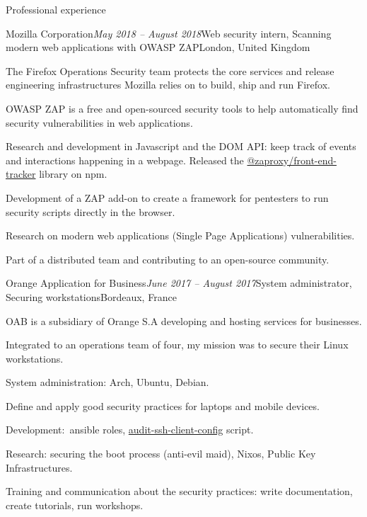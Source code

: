 \begin{rSection}{Professional experience}

  \begin{rSubsection}{Mozilla Corporation}{\em May 2018 -- August 2018}{Web security intern, Scanning modern web applications with OWASP ZAP}{London, United Kingdom}
    \item[]
      The Firefox Operations Security team protects the core services and release engineering infrastructures Mozilla relies on to build, ship and run Firefox.
    \item[]
      OWASP ZAP is a free and open-sourced security tools to help automatically find security vulnerabilities in web applications.

    \item Research and development in Javascript and the DOM API: keep track of events and interactions happening in a webpage. Released the \href{https://www.npmjs.com/package/@zaproxy/front-end-tracker}{@zaproxy/front-end-tracker} library on npm.
    \item Development of a ZAP add-on to create a framework for pentesters to run security scripts directly in the browser.
    \item Research on modern web applications (Single Page Applications) vulnerabilities.
    \item Part of a distributed team and contributing to an open-source community.
  \end{rSubsection}


  \begin{rSubsection}{Orange Application for Business}{\em June 2017 -- August 2017}{System administrator, Securing workstations}{Bordeaux, France}
    \item[]
      OAB is a subsidiary of Orange S.A developing and hosting services for businesses.
    \item[]
      Integrated to an operations team of four, my mission was to secure their Linux workstations.

    \item System administration: Arch, Ubuntu, Debian.
    \item Define and apply good security practices for laptops and mobile devices.
    \item Development: ansible roles, \href{https://github.com/multimediabs/audit-ssh-client-config}{audit-ssh-client-config} script.
    \item Research: securing the boot process (anti-evil maid), Nixos, Public Key Infrastructures.
    \item Training and communication about the security practices: write documentation, create tutorials, run workshops.
  \end{rSubsection}


\end{rSection}
